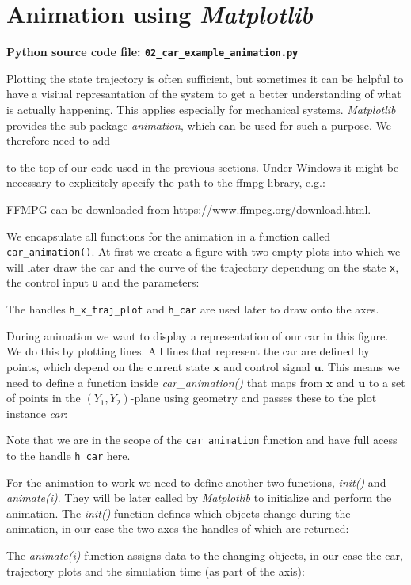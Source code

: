 \documentclass[a4paper,11pt,headings=standardclasses,parskip=half]{scrartcl}
\newcommand{\listcode}[3]{}
\newcommand{\listcodeanim}[2]{\listcode{#1}{#2}{../sim/02_car_example_animation.py}}
\newcommand{\mpl}{\emph{Matplotlib}\xspace}
\newcommand{\uu}{\mathbf{u}}
\newcommand{\x}{\mathbf{x}}
\begin{document}
\section{Animation using \mpl} \label{sec:animation}

\textbf{Python source code file: \texttt{02\_car\_example\_animation.py}}

Plotting the state trajectory is often sufficient, but sometimes it can be helpful to have a visiual represantation of the system to get a better understanding of what is actually happening. This applies especially for mechanical systems. \mpl provides the sub-package \emph{animation}, which can be used for such a purpose. We therefore need to add 
\listcodeanim{6}{6}
to the top of our code used in the previous sections. Under Windows it might be necessary to explicitely specify the path to the ffmpg library, e.g.:
\listcodeanim{7}{7}
FFMPG can be downloaded from \url{https://www.ffmpeg.org/download.html}.

We encapsulate all functions for the animation in a function called \texttt{car\_animation()}. At first we create a figure with two empty plots into which we will later draw the car and the curve of the trajectory dependung on the state \texttt{x}, the control input \texttt{u} and the parameters:
\listcodeanim{137}{165}
The handles \texttt{h\_x\_traj\_plot} and \texttt{h\_car} are used later to draw onto the axes.

During animation we want to display a representation of our car in this figure. We do this by plotting lines. All lines that represent the car are defined by points, which depend on the current state $\x$ and control signal $\uu$. This means we need to define a function inside \emph{car\_animation()} that maps from $\x$ and $\uu$ to a set of points in the $(Y_1,Y_2)$-plane using geometry and passes these to the plot instance \emph{car}:
\listcodeanim{167}{226}
Note that we are in the scope of the \texttt{car\_animation} function and have full acess to the handle \texttt{h\_car} here.

For the animation to work we need to define another two functions, \emph{init()} and \emph{animate(i)}. They will be later called by \mpl to initialize and perform the animation. The \emph{init()}-function defines which objects change during the animation, in our case the two axes the handles of which are returned:
\listcodeanim{225}{234}

The \emph{animate(i)}-function assigns data to the changing objects, in our case the car, trajectory plots and the simulation time (as part of the axis):
\listcodeanim{236}{250}
\end{document}
